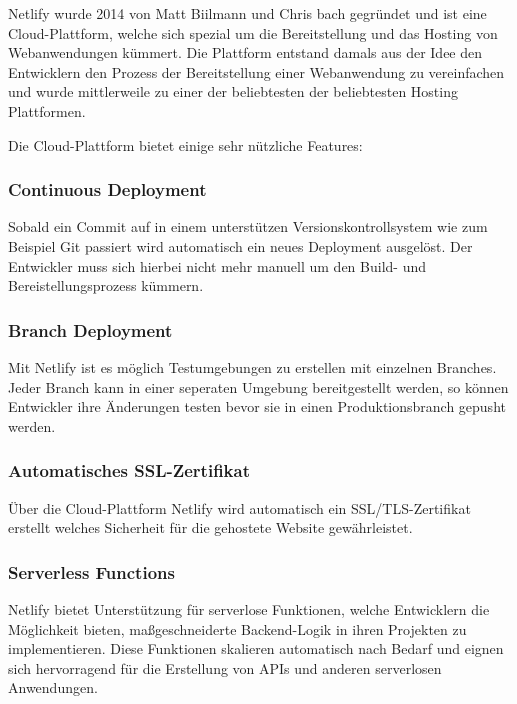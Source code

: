 Netlify wurde 2014 von Matt Biilmann und Chris bach gegründet und ist eine Cloud-Plattform, welche sich spezial um die Bereitstellung und das Hosting von Webanwendungen kümmert. Die Plattform entstand damals aus der Idee den Entwicklern den Prozess der Bereitstellung einer Webanwendung zu vereinfachen und wurde mittlerweile zu einer der beliebtesten der beliebtesten Hosting Plattformen.

Die Cloud-Plattform bietet einige sehr nützliche Features:

\subsubsection{Continuous Deployment}
Sobald ein Commit auf in einem unterstützen Versionskontrollsystem wie zum Beispiel Git passiert wird automatisch ein neues Deployment ausgelöst. Der Entwickler muss sich hierbei nicht mehr manuell um den Build- und Bereistellungsprozess kümmern.

\subsubsection{Branch Deployment}
Mit Netlify ist es möglich Testumgebungen zu erstellen mit einzelnen Branches. Jeder Branch kann in einer seperaten Umgebung bereitgestellt werden, so können Entwickler ihre Änderungen testen bevor sie in einen Produktionsbranch gepusht werden.

\subsubsection{Automatisches SSL-Zertifikat}
Über die Cloud-Plattform Netlify wird automatisch ein SSL/TLS-Zertifikat erstellt welches Sicherheit für die gehostete Website gewährleistet.

\subsubsection{Serverless Functions}
Netlify bietet Unterstützung für serverlose Funktionen, welche Entwicklern die Möglichkeit bieten, maßgeschneiderte Backend-Logik in ihren Projekten zu implementieren. Diese Funktionen skalieren automatisch nach Bedarf und eignen sich hervorragend für die Erstellung von APIs und anderen serverlosen Anwendungen.

\cite{Was_ist_Netlify}
